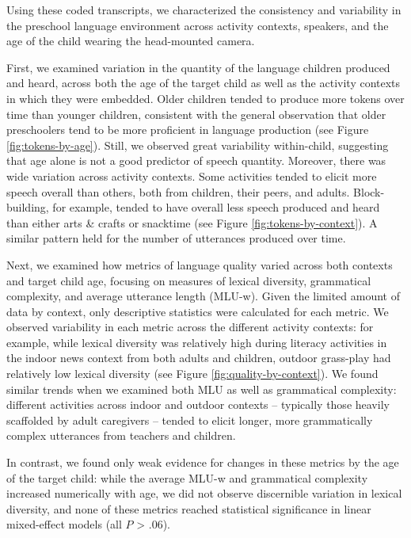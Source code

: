 \documentclass[10pt, letterpaper]{article}
\begin{document}
Using these coded transcripts, we characterized the consistency and
variability in the preschool language environment across activity
contexts, speakers, and the age of the child wearing the head-mounted
camera.

First, we examined variation in the quantity of the language children
produced and heard, across both the age of the target child as well as
the activity contexts in which they were embedded. Older children tended
to produce more tokens over time than younger children, consistent with
the general observation that older preschoolers tend to be more
proficient in language production (see Figure \ref{fig:tokens-by-age}).
Still, we observed great variability within-child, suggesting that age
alone is not a good predictor of speech quantity. Moreover, there was
wide variation across activity contexts. Some activities tended to
elicit more speech overall than others, both from children, their peers,
and adults. Block-building, for example, tended to have overall less
speech produced and heard than either arts \& crafts or snacktime (see
Figure \ref{fig:tokens-by-context}). A similar pattern held for the
number of utterances produced over time.

Next, we examined how metrics of language quality varied across both
contexts and target child age, focusing on measures of lexical
diversity, grammatical complexity, and average utterance length (MLU-w).
Given the limited amount of data by context, only descriptive statistics
were calculated for each metric. We observed variability in each metric
across the different activity contexts: for example, while lexical
diversity was relatively high during literacy activities in the indoor
news context from both adults and children, outdoor grass-play had
relatively low lexical diversity (see Figure
\ref{fig:quality-by-context}). We found similar trends when we examined
both MLU as well as grammatical complexity: different activities across
indoor and outdoor contexts -- typically those heavily scaffolded by
adult caregivers -- tended to elicit longer, more grammatically complex
utterances from teachers and children.

In contrast, we found only weak evidence for changes in these metrics by
the age of the target child: while the average MLU-w and grammatical
complexity increased numerically with age, we did not observe
discernible variation in lexical diversity, and none of these metrics
reached statistical significance in linear mixed-effect models (all
\(P\) \textgreater{} .06).
\end{document}
